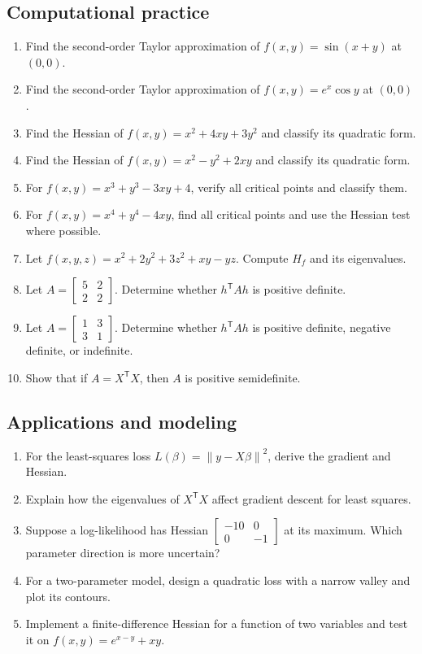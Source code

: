 \documentclass[11pt]{article}
\newcommand{\T}{^{\mathsf T}}
\newcommand{\norm}[1]{\left\lVert #1\right\rVert}
\begin{document}
\subsection*{Computational practice}
\begin{enumerate}[start=11]
  \item Find the second-order Taylor approximation of $f(x,y)=\sin(x+y)$ at $(0,0)$.
  \item Find the second-order Taylor approximation of $f(x,y)=e^x\cos y$ at $(0,0)$.
  \item Find the Hessian of $f(x,y)=x^2+4xy+3y^2$ and classify its quadratic form.
  \item Find the Hessian of $f(x,y)=x^2-y^2+2xy$ and classify its quadratic form.
  \item For $f(x,y)=x^3+y^3-3xy+4$, verify all critical points and classify them.
  \item For $f(x,y)=x^4+y^4-4xy$, find all critical points and use the Hessian test where possible.
  \item Let $f(x,y,z)=x^2+2y^2+3z^2+xy-yz$. Compute $H_f$ and its eigenvalues.
  \item Let $A=\begin{bmatrix}5&2\\2&2\end{bmatrix}$. Determine whether $h\T Ah$ is positive definite.
  \item Let $A=\begin{bmatrix}1&3\\3&1\end{bmatrix}$. Determine whether $h\T Ah$ is positive definite, negative definite, or indefinite.
  \item Show that if $A=X\T X$, then $A$ is positive semidefinite.
\end{enumerate}

\subsection*{Applications and modeling}
\begin{enumerate}[start=21]
  \item For the least-squares loss $L(\beta)=\norm{y-X\beta}^2$, derive the gradient and Hessian.
  \item Explain how the eigenvalues of $X\T X$ affect gradient descent for least squares.
  \item Suppose a log-likelihood has Hessian $\begin{bmatrix}-10&0\\0&-1\end{bmatrix}$ at its maximum. Which parameter direction is more uncertain?
  \item For a two-parameter model, design a quadratic loss with a narrow valley and plot its contours.
  \item Implement a finite-difference Hessian for a function of two variables and test it on $f(x,y)=e^{x-y}+xy$.
\end{enumerate}
\end{document}
